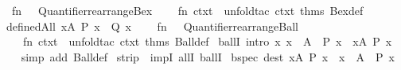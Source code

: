 \begin{isabellebody}
\ \ fn\ {\isacharunderscore}{\kern0pt}\ {\isacharequal}{\kern0pt}{\isachargreater}{\kern0pt}\ Quantifier{}{\isachardot}{\kern0pt}rearrange{\isacharunderscore}{\kern0pt}Bex\isanewline
\ \ \ \ {\isacharparenleft}{\kern0pt}fn\ ctxt\ {\isacharequal}{\kern0pt}{\isachargreater}{\kern0pt}\ unfold{\isacharunderscore}{\kern0pt}tac\ ctxt\ {\isacharat}{\kern0pt}{\isacharbraceleft}{\kern0pt}thms\ Bex{\isacharunderscore}{\kern0pt}def{\isacharbraceright}{\kern0pt}{\isacharparenright}{\kern0pt}\isanewline
{\isacartoucheclose}\isanewline
\isanewline
{}\isamarkupfalse%
\ defined{\isacharunderscore}{\kern0pt}All\ {\isacharparenleft}{\kern0pt}{\isachardoublequoteopen}{\isasymforall}x{\isasymin}A{\isachardot}{\kern0pt}\ P\ x\ {\isasymlongrightarrow}\ Q\ x{\isachardoublequoteclose}{\isacharparenright}{\kern0pt}\ {\isacharequal}{\kern0pt}\ {\isacartoucheopen}\isanewline
\ \ fn\ {\isacharunderscore}{\kern0pt}\ {\isacharequal}{\kern0pt}{\isachargreater}{\kern0pt}\ Quantifier{}{\isachardot}{\kern0pt}rearrange{\isacharunderscore}{\kern0pt}Ball\isanewline
\ \ \ \ {\isacharparenleft}{\kern0pt}fn\ ctxt\ {\isacharequal}{\kern0pt}{\isachargreater}{\kern0pt}\ unfold{\isacharunderscore}{\kern0pt}tac\ ctxt\ {\isacharat}{\kern0pt}{\isacharbraceleft}{\kern0pt}thms\ Ball{\isacharunderscore}{\kern0pt}def{\isacharbraceright}{\kern0pt}{\isacharparenright}{\kern0pt}\isanewline
{\isacartoucheclose}%
\endisatagML
{\isafoldML}%
%
\isadelimML
\isanewline
%
\endisadelimML
\isanewline
{}\isamarkupfalse%
\ ballI\ {\isacharbrackleft}{\kern0pt}intro{\isacharbang}{\kern0pt}{\isacharbrackright}{\kern0pt}{\isacharcolon}{\kern0pt}\ {\isachardoublequoteopen}{\isacharparenleft}{\kern0pt}{\isasymAnd}x{\isachardot}{\kern0pt}\ x\ {\isasymin}\ A\ {\isasymLongrightarrow}\ P\ x{\isacharparenright}{\kern0pt}\ {\isasymLongrightarrow}\ {\isasymforall}x{\isasymin}A{\isachardot}{\kern0pt}\ P\ x{\isachardoublequoteclose}\isanewline
%
\isadelimproof
\ \ %
\endisadelimproof
%
\isatagproof
{}\isamarkupfalse%
\ {\isacharparenleft}{\kern0pt}simp\ add{\isacharcolon}{\kern0pt}\ Ball{\isacharunderscore}{\kern0pt}def{\isacharparenright}{\kern0pt}%
\endisatagproof
{\isafoldproof}%
%
\isadelimproof
\isanewline
%
\endisadelimproof
\isanewline
{}\isamarkupfalse%
\ strip\ {\isacharequal}{\kern0pt}\ impI\ allI\ ballI\isanewline
\isanewline
{}\isamarkupfalse%
\ bspec\ {\isacharbrackleft}{\kern0pt}dest{\isacharquery}{\kern0pt}{\isacharbrackright}{\kern0pt}{\isacharcolon}{\kern0pt}\ {\isachardoublequoteopen}{\isasymforall}x{\isasymin}A{\isachardot}{\kern0pt}\ P\ x\ {\isasymLongrightarrow}\ x\ {\isasymin}\ A\ {\isasymLongrightarrow}\ P\ x{\isachardoublequoteclose}\isanewline

\end{isabellebody}
